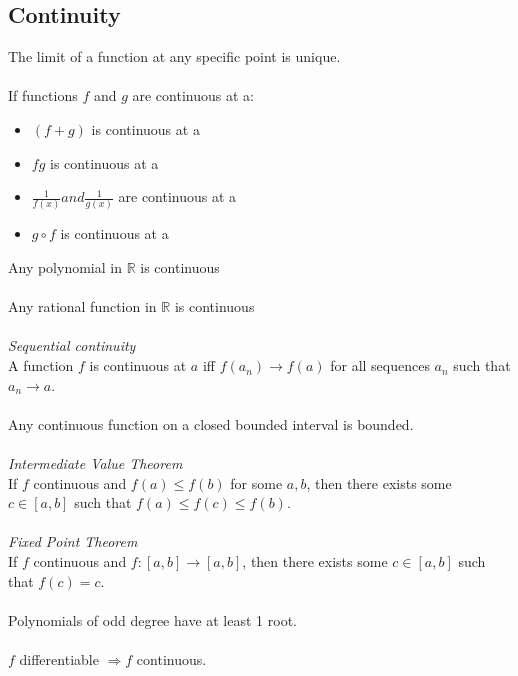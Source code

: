 \documentclass{article}
\newcommand{\R}{\mathbb{R}}
\begin{document}
\subsection{Continuity}
The limit of a function at any specific point is unique.
\\\\
If functions $ f $ and $ g $ are continuous at a:
\begin{itemize}
\item $ (f + g) $ is continuous at a
\item $ fg $ is continuous at a
\item $ \frac{1}{f(x)} and \frac{1}{g(x)} $ are continuous at a
\item $ g \circ f $ is continuous at a
\end{itemize}
Any polynomial in $ \R $ is continuous
\\\\
Any rational function in $ \R $ is continuous
\\\\
\textit{Sequential continuity}
\\
A function $ f $ is continuous at $ a $ iff $ f(a_{n}) \to f(a) $ for all sequences $ a_{n} $ such that $ a_{n} \to a $.
\\\\
Any continuous function on a closed bounded interval is bounded.
\\\\
\textit{Intermediate Value Theorem}
\\
If $ f $ continuous and $ f(a) \leq f(b) $ for some $ a, b $, then there exists some $ c \in [a, b] $ such that $ f(a) \leq f(c) \leq f(b) $.
\\\\
\textit{Fixed Point Theorem}
\\
If $ f $ continuous and $ f: [a, b] \to [a, b] $, then there exists some $ c \in [a, b] $ such that $ f(c) = c $.
\\\\
Polynomials of odd degree have at least 1 root.
\\\\
$ f $ differentiable $ \Rightarrow f $ continuous.
\end{document}
